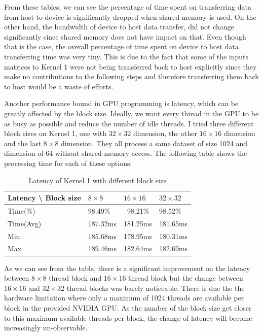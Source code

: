 \documentclass[11pt]{article}       %
\begin{document}
\break

From these tables, we can see the percentage of time spent on transferring data from host to device is significantly dropped when shared memory is used. On the other hand, the bandwidth of device to host data transfer, did not change significantly since shared memory does not have impact on that. Even though that is the case, the overall percentage of time spent on device to host data transferring time was very tiny. This is due to the fact that some of the inputs matrices to Kernel 1 were not being transferred back to host explicitly since they make no contributions to the following steps and therefore transferring them back to host would be a waste of efforts.

Another performance bound in GPU programming is latency, which can be greatly affected by the block size. Ideally, we want every thread in the GPU to be as busy as possible and reduce the number of idle threads. I tried three different block sizes on Kernel 1, one with $32 \times 32$ dimension, the other $16 \times 16$ dimension and the last $8 \times 8$ dimension. They all process a same dataset of size 1024 and dimension of 64 without shared memory access. The following table shows the processing time for each of these options:

\begin{table}[ht]
\centering
\caption{Latency of Kernel 1 with different block size}
\begin{tabular}{|l|l|l|l|} 
\hline
Latency \textbackslash{} Block size & $8 \times 8$     & $16 \times 16$   & $32 \times 32$    \\ 
\hline
Time(\%)                            & 98.49\%  & ~98.21\% & 98.52\%   \\ 
\hline
Time(Avg)                           & 187.32ms & 181.25ms & 181.65ms  \\ 
\hline
Min                                 & 185.68ms & 178.95ms & 180.31ms  \\ 
\hline
Max                                 & 189.46ms & 182.64ms & 182.69ms  \\
\hline
\end{tabular}
\end{table}

As we can see from the table, there is a significant improvement on the latency between $8 \times 8$ thread block and $16 \times 16$ thread block but the change between $16 \times 16$ and $32 \times 32$ thread blocks was barely noticeable. There is due the the hardware limitation where only a maximum of 1024 threads are available per block in the provided NVIDIA GPU. As the number of the block size get closer to this maximum available threads per block, the change of latency will become increasingly un-observable.
\end{document}
